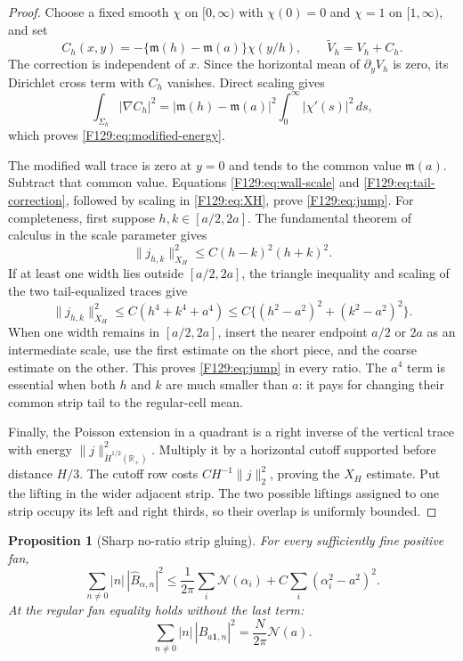 \documentclass[11pt]{amsart}
\numberwithin{equation}{section}
\newtheorem{proposition}[theorem]{Proposition}
\theoremstyle{definition}
\theoremstyle{remark}
\begin{document}
\begin{proof}
Choose a fixed smooth \(\chi\) on \([0,\infty)\) with
\(\chi(0)=0\) and \(\chi=1\) on \([1,\infty)\), and set
\begin{equation}\label{F129:eq:tail-correction}
 C_h(x,y)=-\{\mathfrak m(h)-\mathfrak m(a)\}\chi(y/h),
 \qquad \widetilde V_h=V_h+C_h.
\end{equation}
The correction is independent of \(x\).  Since the horizontal mean of
\(\partial_yV_h\) is zero, its Dirichlet cross term with \(C_h\) vanishes.
Direct scaling gives
\begin{equation}
 \int_{\Sigma_h}|\nabla C_h|^2
 =|\mathfrak m(h)-\mathfrak m(a)|^2
   \int_0^\infty|\chi'(s)|^2\,ds,
\end{equation}
which proves \eqref{F129:eq:modified-energy}.

The modified wall trace is zero at \(y=0\) and tends to the common value
\(\mathfrak m(a)\).  Subtract that common value.  Equations
\eqref{F129:eq:wall-scale} and \eqref{F129:eq:tail-correction}, followed by scaling
in \eqref{F129:eq:XH}, prove \eqref{F129:eq:jump}.  For completeness, first suppose
\(h,k\in[a/2,2a]\).  The fundamental theorem of calculus in the scale
parameter gives
\[
 \|j_{h,k}\|_{X_H}^2\le C(h-k)^2(h+k)^2.
\]
If at least one width lies outside \([a/2,2a]\), the triangle inequality
and scaling of the two tail-equalized traces give
\[
 \|j_{h,k}\|_{X_H}^2
 \le C(h^4+k^4+a^4)
 \le C\{(h^2-a^2)^2+(k^2-a^2)^2\}.
\]
When one width remains in \([a/2,2a]\), insert the nearer endpoint
\(a/2\) or \(2a\) as an intermediate scale, use the first estimate on the
short piece, and the coarse estimate on the other.  This proves
\eqref{F129:eq:jump} in every ratio.  The \(a^4\) term is essential when both
\(h\) and \(k\) are much smaller than \(a\): it pays for changing their
common strip tail to the regular-cell mean.

Finally, the Poisson extension in a quadrant is a right inverse of the
vertical trace with energy
\(\|j\|_{\dot H^{1/2}(\mathbb R_+)}^2\).  Multiply it by a horizontal cutoff
supported before distance \(H/3\).  The cutoff row costs
\(CH^{-1}\|j\|_2^2\), proving the \(X_H\) estimate.  Put the lifting in the
wider adjacent strip.  The two possible liftings assigned to one strip
occupy its left and right thirds, so their overlap is uniformly bounded.
\end{proof}

\begin{proposition}[Sharp no-ratio strip gluing]\label{F129:prop:gluing}
For every sufficiently fine positive fan,
\begin{equation}\label{F129:eq:gluing}
 \sum_{n\ne0}|n|\,|\widehat B_{\alpha,n}|^2
 \le\frac1{2\pi}\sum_i\mathcal N(\alpha_i)
   +C\sum_i(\alpha_i^2-a^2)^2.
\end{equation}
At the regular fan equality holds without the last term:
\begin{equation}\label{F129:eq:uniform-strip}
 \sum_{n\ne0}|n|\,|\widehat B_{a\mathbf1,n}|^2
 =\frac N{2\pi}\mathcal N(a).
\end{equation}
\end{proposition}
\end{document}
